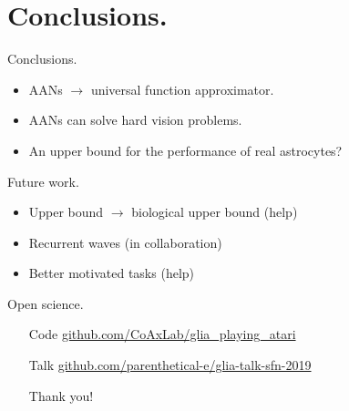\documentclass[10pt]{beamer}
\begin{document}
\section[Conclusions.]{Conclusions.}
\begin{frame}[fragile]{Conclusions.}
\begin{itemize}
\item AANs $\rightarrow$ universal function approximator.
\item AANs can solve hard vision problems.
\item An \alert{upper bound} for the performance of real astrocytes? 
\end{itemize}
\end{frame}

\begin{frame}[fragile]{Future work.}
\begin{itemize}
\item Upper bound $\rightarrow$ biological upper bound (\alert{help})
\item Recurrent waves (in collaboration)
\item Better motivated tasks (\alert{help})
\end{itemize}
\end{frame}

\begin{frame}[fragile]{Open science.}
\begin{itemize}
\item[Code] \url{github.com/CoAxLab/glia_playing_atari}
\item[Talk] \url{github.com/parenthetical-e/glia-talk-sfn-2019}
\item[] 
\item[] \alert{Thank you!}
\end{itemize}
\end{frame}


%   
%   

\end{document}
